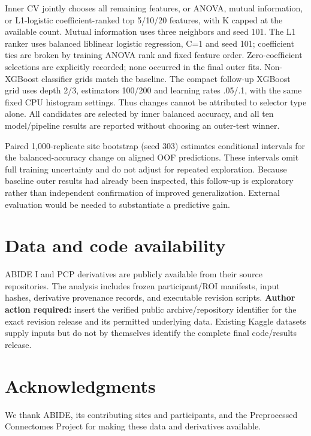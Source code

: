 \documentclass[10pt,letterpaper]{article}
\begin{document}
Inner CV jointly chooses all remaining features, or ANOVA, mutual information,
or L1-logistic coefficient-ranked top 5/10/20 features, with K capped at the
available count. Mutual information uses three neighbors and seed 101. The L1
ranker uses balanced liblinear logistic regression, C=1 and seed 101; coefficient
ties are broken by training ANOVA rank and fixed feature order. Zero-coefficient
selections are explicitly recorded; none occurred in the final outer fits.
Non-XGBoost classifier grids match the baseline. The compact follow-up XGBoost
grid uses depth 2/3, estimators 100/200 and learning rates .05/.1, with the same
fixed CPU histogram settings. Thus changes cannot be attributed to selector type
alone. All candidates are selected by inner balanced accuracy, and all ten
model/pipeline results are reported without choosing an outer-test winner.

Paired 1,000-replicate site bootstrap (seed 303) estimates conditional intervals
for the balanced-accuracy change on aligned OOF predictions. These intervals
omit full training uncertainty and do not adjust for repeated exploration.
Because baseline outer results had already been inspected, this follow-up is
exploratory rather than independent confirmation of improved generalization.
External evaluation would be needed to substantiate a predictive gain.

\section*{Data and code availability}
ABIDE I and PCP derivatives are publicly available from their source repositories.
The analysis includes frozen participant/ROI manifests, input hashes, derivative
provenance records, and executable revision scripts.
\textbf{Author action required:} insert the verified public archive/repository
identifier for the exact revision release and its permitted underlying data.
Existing Kaggle datasets supply inputs but do not by themselves identify the
complete final code/results release.

\section*{Acknowledgments}
We thank ABIDE, its contributing sites and participants, and the Preprocessed
Connectomes Project for making these data and derivatives available.

\nolinenumbers

\end{document}
